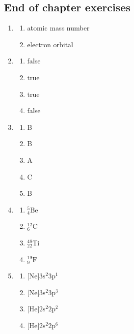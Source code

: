 \subsection{End of chapter exercises} 
\begin{multicols}{4}
\begin{enumerate}[noitemsep, label=\textbf{\arabic*}. ] 
\item %
    \begin{enumerate}[noitemsep, label=\textbf{(\alph*)} ]
    \item atomic mass number
    \item electron orbital
    \end{enumerate}
\item %
    \begin{enumerate}[noitemsep, label=\textbf{(\alph*)} ]
    \item false
    \item true
    \item true
    \item false
    \end{enumerate}
\item %
    \begin{enumerate}[noitemsep, label=\textbf{(\alph*)} ]
    \item B
    \item B
    \item A
    \item C
    \item B
    \end{enumerate}
\item %
    \begin{enumerate}[noitemsep, label=\textbf{(\alph*)} ]
    \item $^{5}_{4}\text{Be}$
    \item $^{12}_{6}\text{C}$
    \item $^{48}_{22}\text{Ti}$
    \item $^{19}_{9}\text{F}$
    \end{enumerate}
\item %
    \begin{enumerate}[noitemsep, label=\textbf{(\alph*)} ]
    \item $\text{[Ne]} 3\text{s}^2 3\text{p}^1$
    \item $\text{[Ne]} 3\text{s}^2 3\text{p}^3$
    \item $\text{[He]} 2\text{s}^2 2\text{p}^2$
    \item $\text{[He]} 2\text{s}^2 2\text{p}^6$

\end{enumerate}
\end{enumerate}
\end{multicols}
